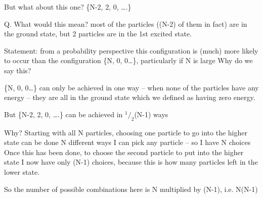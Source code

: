 \documentclass[ignorenonframetext]{beamer}
\begin{document}
\begin{frame}[allowframebreaks]
But what about this one?    \quad   \{N-2, 2, 0, ….\} \medskip
 
Q. What would this mean? \newline
most of the particles ((N-2) of them in fact) are in the ground state, but 2 particles are in the 1st excited state.\newline

Statement: from a probability perspective this configuration is (much) more likely to occur than the configuration \{N, 0, 0…\}, particularly if N is large\newline
Why do we say this?\newline

\{N, 0, 0…\} can only be achieved in one way -- when none of the particles have any energy -- they are all in the ground state which we defined as having zero energy. 
 
But \{N-2, 2, 0, ….\} can be achieved in \(^1/_2\)(N-1) ways\newline
 
Why?
Starting with all N particles, choosing one particle to go into the higher state can be done N different ways\newline\smallskip
I can pick any particle -- so I have N choices
Once this has been done, to choose the second particle to put into the higher state I now have only (N-1) choices, because this is how many particles left in the lower state.\par\smallskip So the number of possible combinations here is N multiplied by (N-1), i.e. N(N-1) 
\end{frame}
\end{document}
